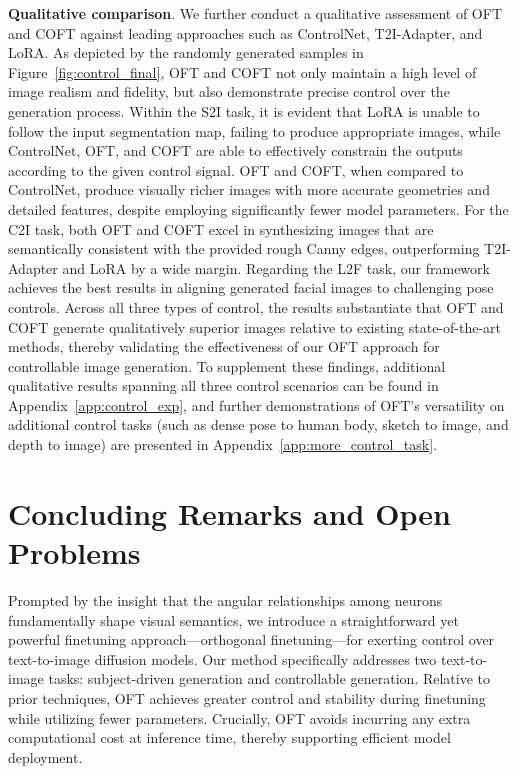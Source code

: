 \textbf{Qualitative comparison}. We further conduct a qualitative assessment of OFT and COFT against leading approaches such as ControlNet, T2I-Adapter, and LoRA. As depicted by the randomly generated samples in Figure~\ref{fig:control_final}, OFT and COFT not only maintain a high level of image realism and fidelity, but also demonstrate precise control over the generation process. Within the S2I task, it is evident that LoRA is unable to follow the input segmentation map, failing to produce appropriate images, while ControlNet, OFT, and COFT are able to effectively constrain the outputs according to the given control signal. OFT and COFT, when compared to ControlNet, produce visually richer images with more accurate geometries and detailed features, despite employing significantly fewer model parameters. For the C2I task, both OFT and COFT excel in synthesizing images that are semantically consistent with the provided rough Canny edges, outperforming T2I-Adapter and LoRA by a wide margin. Regarding the L2F task, our framework achieves the best results in aligning generated facial images to challenging pose controls. Across all three types of control, the results substantiate that OFT and COFT generate qualitatively superior images relative to existing state-of-the-art methods, thereby validating the effectiveness of our OFT approach for controllable image generation. To supplement these findings, additional qualitative results spanning all three control scenarios can be found in Appendix~\ref{app:control_exp}, and further demonstrations of OFT’s versatility on additional control tasks (such as dense pose to human body, sketch to image, and depth to image) are presented in Appendix~\ref{app:more_control_task}.

\section{Concluding Remarks and Open Problems}

Prompted by the insight that the angular relationships among neurons fundamentally shape visual semantics, we introduce a straightforward yet powerful finetuning approach—orthogonal finetuning—for exerting control over text-to-image diffusion models. Our method specifically addresses two text-to-image tasks: subject-driven generation and controllable generation. Relative to prior techniques, OFT achieves greater control and stability during finetuning while utilizing fewer parameters. Crucially, OFT avoids incurring any extra computational cost at inference time, thereby supporting efficient model deployment.

